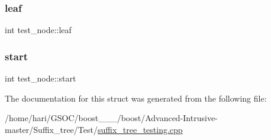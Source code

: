 \mbox{\label{structtest__node_a2c46ffd93d63f06a29e2928cee863435}} 
\subsubsection{\texorpdfstring{leaf}{leaf}}
{\footnotesize\ttfamily int test\+\_\+node\+::leaf}

\mbox{\label{structtest__node_ae97568efab015dc1f2c6c727fb5da6cc}} 
\subsubsection{\texorpdfstring{start}{start}}
{\footnotesize\ttfamily int test\+\_\+node\+::start}



The documentation for this struct was generated from the following file\+:\begin{DoxyCompactItemize}
\item 
/home/hari/\+G\+S\+O\+C/boost\+\_\+\_\+\_/boost/\+Advanced-\/\+Intrusive-\/master/\+Suffix\+\_\+tree/\+Test/\hyperlink{suffix__tree__testing_8cpp}{suffix\+\_\+tree\+\_\+testing.\+cpp}\end{DoxyCompactItemize}
